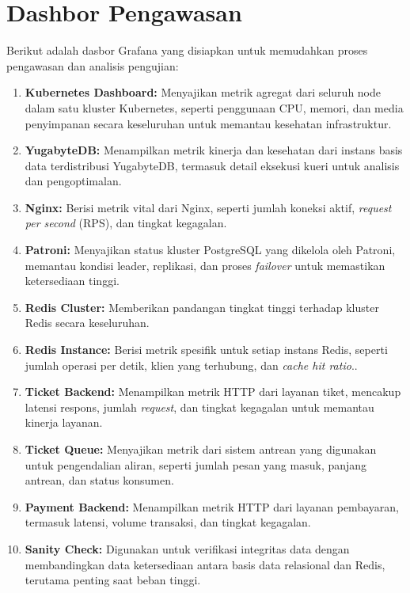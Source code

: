 \chapter{Dashbor Pengawasan}
\label{apx:monitoring-dashboard}

Berikut adalah dasbor Grafana yang disiapkan untuk memudahkan proses pengawasan dan analisis pengujian:

\begin{enumerate}
    \item \textbf{Kubernetes Dashboard:} Menyajikan metrik agregat dari seluruh node dalam satu kluster Kubernetes, seperti penggunaan CPU, memori, dan media penyimpanan secara keseluruhan untuk memantau kesehatan infrastruktur.
    \item \textbf{YugabyteDB:} Menampilkan metrik kinerja dan kesehatan dari instans basis data terdistribusi YugabyteDB, termasuk detail eksekusi kueri untuk analisis dan pengoptimalan.
    \item \textbf{Nginx:} Berisi metrik vital dari Nginx, seperti jumlah koneksi aktif, \textit{request per second} (RPS), dan tingkat kegagalan.
    \item \textbf{Patroni:} Menyajikan status kluster PostgreSQL yang dikelola oleh Patroni, memantau kondisi leader, replikasi, dan proses \textit{failover} untuk memastikan ketersediaan tinggi.
    \item \textbf{Redis Cluster:} Memberikan pandangan tingkat tinggi terhadap kluster Redis secara keseluruhan.
    \item \textbf{Redis Instance:} Berisi metrik spesifik untuk setiap instans Redis, seperti jumlah operasi per detik, klien yang terhubung, dan \textit{cache hit ratio}..
    \item \textbf{Ticket Backend:} Menampilkan metrik HTTP dari layanan tiket, mencakup latensi respons, jumlah \textit{request}, dan tingkat kegagalan untuk memantau kinerja layanan.
    \item \textbf{Ticket Queue:} Menyajikan metrik dari sistem antrean yang digunakan untuk pengendalian aliran, seperti jumlah pesan yang masuk, panjang antrean, dan status konsumen.
    \item \textbf{Payment Backend:} Menampilkan metrik HTTP dari layanan pembayaran, termasuk latensi, volume transaksi, dan tingkat kegagalan.
    \item \textbf{Sanity Check:} Digunakan untuk verifikasi integritas data dengan membandingkan data ketersediaan antara basis data relasional dan Redis, terutama penting saat beban tinggi.

\end{enumerate}
